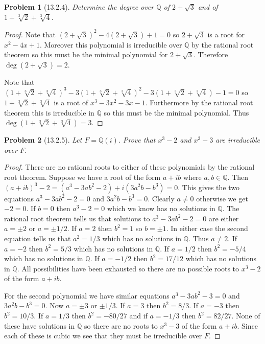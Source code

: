 \documentclass{article}
\newtheorem{problem}{Problem}
\begin{document}
\begin{problem}[13.2.4]
Determine the degree over $\mathbb{Q}$ of $2 + \sqrt{3}$ and of $1 + \sqrt[3]{2} + \sqrt[3]{4}$.
\end{problem}
\begin{proof}
Note that $(2 + \sqrt{3})^2 - 4(2 + \sqrt{3}) + 1 = 0$ so $2 + \sqrt{3}$ is a root for $x^2 - 4x + 1$. Moreover this polynomial is irreducible over $\mathbb{Q}$ by the rational root theorem so this must be the minimal polynomial for $2 + \sqrt{3}$. Therefore $\deg (2 + \sqrt{3}) = 2$.

Note that $(1 + \sqrt[3]{2} + \sqrt[3]{4})^3 - 3(1 + \sqrt[3]{2} + \sqrt[3]{4})^2 - 3(1 + \sqrt[3]{2} + \sqrt[3]{4}) - 1 = 0$ so $1 + \sqrt[3]{2} + \sqrt[3]{4}$ is a root of $x^3 - 3x^2 - 3x - 1$. Furthermore by the rational root theorem this is irreducible in $\mathbb{Q}$ so this must be the minimal polynomial. Thus $\deg (1 + \sqrt[3]{2} + \sqrt[3]{4}) = 3$.
\end{proof}

\begin{problem}[13.2.5]
Let $F = \mathbb{Q}(i)$. Prove that $x^3 - 2$ and $x^3 - 3$ are irreducible over $F$.
\end{problem}
\begin{proof}
There are no rational roots to either of these polynomials by the rational root theorem. Suppose we have a root of the form $a+ib$ where $a,b \in \mathbb{Q}$. Then $(a + ib)^3 - 2 = (a^3-3ab^2-2) + i(3a^2b-b^3) = 0$. This gives the two equations $a^3 - 3ab^2 - 2 = 0$ and $3a^2b - b^3 = 0$. Clearly $a \neq 0$ otherwise we get $-2 = 0$. If $b = 0$ then $a^3 - 2 = 0$ which we know has no solutions in $\mathbb{Q}$. The rational root theorem tells us that solutions to $a^3 - 3ab^2 - 2 = 0$ are either $a = \pm 2$ or $a = \pm 1/2$. If $a = 2$ then $b^2 = 1$ so $b = \pm 1$. In either case the second equation tells us that $a^2 = 1/3$ which has no solutions in $\mathbb{Q}$. Thus $a \neq 2$. If $a = -2$ then $b^2 = 5/3$ which has no solutions in $\mathbb{Q}$. If $a = 1/2$ then $b^2 = -5/4$ which has no solutions in $\mathbb{Q}$. If $a = -1/2$ then $b^2 = 17/12$ which has no solutions in $\mathbb{Q}$. All possibilities have been exhausted so there are no possible roots to $x^3 - 2$ of the form $a + ib$.

For the second polynomial we have similar equations $a^3 - 3ab^2 - 3 = 0$ and $3a^2b - b^3 = 0$. Now $a = \pm 3$ or $\pm 1/3$. If $a = 3$ then $b^2 = 8/3$. If $a = -3$ then $b^2 = 10/3$. If $a = 1/3$ then $b^2 = -80/27$ and if $a = -1/3$ then $b^2 = 82/27$. None of these have solutions in $\mathbb{Q}$ so there are no roots to $x^3 - 3$ of the form $a + ib$. Since each of these is cubic we see that they must be irreducible over $F$.
\end{proof}
\end{document}
